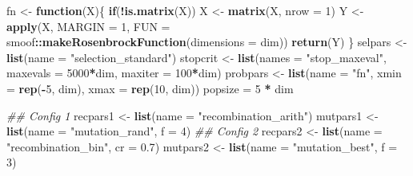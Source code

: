 \documentclass[]{article}
\newenvironment{Shaded}{\begin{snugshade}}{\end{snugshade}}
\newcommand{\CommentTok}[1]{\textcolor[rgb]{0.56,0.35,0.01}{\textit{#1}}}
\newcommand{\ControlFlowTok}[1]{\textcolor[rgb]{0.13,0.29,0.53}{\textbf{#1}}}
\newcommand{\DataTypeTok}[1]{\textcolor[rgb]{0.13,0.29,0.53}{#1}}
\newcommand{\DecValTok}[1]{\textcolor[rgb]{0.00,0.00,0.81}{#1}}
\newcommand{\FloatTok}[1]{\textcolor[rgb]{0.00,0.00,0.81}{#1}}
\newcommand{\KeywordTok}[1]{\textcolor[rgb]{0.13,0.29,0.53}{\textbf{#1}}}
\newcommand{\NormalTok}[1]{#1}
\newcommand{\OperatorTok}[1]{\textcolor[rgb]{0.81,0.36,0.00}{\textbf{#1}}}
\newcommand{\StringTok}[1]{\textcolor[rgb]{0.31,0.60,0.02}{#1}}
\begin{document}
\begin{Shaded}
\begin{Highlighting}[]
\NormalTok{        fn <-}\StringTok{ }\ControlFlowTok{function}\NormalTok{(X)\{}
            \ControlFlowTok{if}\NormalTok{(}\OperatorTok{!}\KeywordTok{is.matrix}\NormalTok{(X)) X <-}\StringTok{ }\KeywordTok{matrix}\NormalTok{(X, }\DataTypeTok{nrow =} \DecValTok{1}\NormalTok{) }
\NormalTok{            Y <-}\StringTok{ }\KeywordTok{apply}\NormalTok{(X, }\DataTypeTok{MARGIN =} \DecValTok{1}\NormalTok{,}
                       \DataTypeTok{FUN =}\NormalTok{ smoof}\OperatorTok{::}\KeywordTok{makeRosenbrockFunction}\NormalTok{(}\DataTypeTok{dimensions =}\NormalTok{ dim))}
            \KeywordTok{return}\NormalTok{(Y)}
\NormalTok{        \}}
\NormalTok{        selpars <-}\StringTok{ }\KeywordTok{list}\NormalTok{(}\DataTypeTok{name =} \StringTok{"selection_standard"}\NormalTok{)}
\NormalTok{        stopcrit <-}\StringTok{ }\KeywordTok{list}\NormalTok{(}\DataTypeTok{names =} \StringTok{"stop_maxeval"}\NormalTok{, }\DataTypeTok{maxevals =} \DecValTok{5000}\OperatorTok{*}\NormalTok{dim, }\DataTypeTok{maxiter =} \DecValTok{100}\OperatorTok{*}\NormalTok{dim)}
\NormalTok{        probpars <-}\StringTok{ }\KeywordTok{list}\NormalTok{(}\DataTypeTok{name =} \StringTok{"fn"}\NormalTok{, }\DataTypeTok{xmin =} \KeywordTok{rep}\NormalTok{(}\OperatorTok{-}\DecValTok{5}\NormalTok{, dim), }\DataTypeTok{xmax =} \KeywordTok{rep}\NormalTok{(}\DecValTok{10}\NormalTok{, dim))}
\NormalTok{        popsize =}\StringTok{ }\DecValTok{5} \OperatorTok{*}\StringTok{ }\NormalTok{dim}
    
        \CommentTok{## Config 1}
\NormalTok{        recpars1 <-}\StringTok{ }\KeywordTok{list}\NormalTok{(}\DataTypeTok{name =} \StringTok{"recombination_arith"}\NormalTok{)}
\NormalTok{        mutpars1 <-}\StringTok{ }\KeywordTok{list}\NormalTok{(}\DataTypeTok{name =} \StringTok{"mutation_rand"}\NormalTok{, }\DataTypeTok{f =} \DecValTok{4}\NormalTok{)}
        \CommentTok{## Config 2}
\NormalTok{        recpars2 <-}\StringTok{ }\KeywordTok{list}\NormalTok{(}\DataTypeTok{name =} \StringTok{"recombination_bin"}\NormalTok{, }\DataTypeTok{cr =} \FloatTok{0.7}\NormalTok{)}
\NormalTok{        mutpars2 <-}\StringTok{ }\KeywordTok{list}\NormalTok{(}\DataTypeTok{name =} \StringTok{"mutation_best"}\NormalTok{, }\DataTypeTok{f =} \DecValTok{3}\NormalTok{)}
    

\end{Highlighting}
\end{Shaded}
\end{document}
